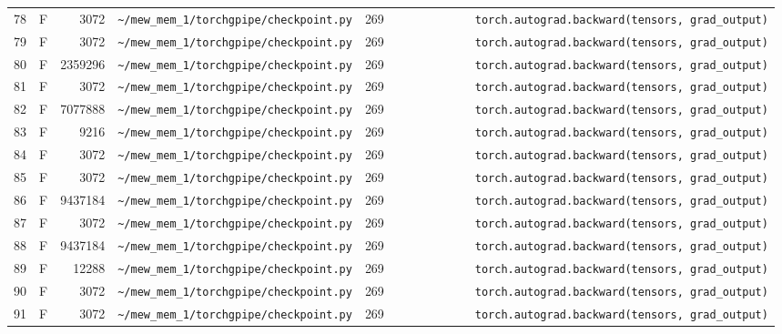 \documentclass{article}
\begin{document}
\begin{longtable}{r l r p{6.5cm} r p{7.0cm}}
78 & F & 3072 & \lstinline|~/mew_mem_1/torchgpipe/checkpoint.py| & 269 & \lstinline|            torch.autograd.backward(tensors, grad_output)| \\
79 & F & 3072 & \lstinline|~/mew_mem_1/torchgpipe/checkpoint.py| & 269 & \lstinline|            torch.autograd.backward(tensors, grad_output)| \\
80 & F & 2359296 & \lstinline|~/mew_mem_1/torchgpipe/checkpoint.py| & 269 & \lstinline|            torch.autograd.backward(tensors, grad_output)| \\
81 & F & 3072 & \lstinline|~/mew_mem_1/torchgpipe/checkpoint.py| & 269 & \lstinline|            torch.autograd.backward(tensors, grad_output)| \\
82 & F & 7077888 & \lstinline|~/mew_mem_1/torchgpipe/checkpoint.py| & 269 & \lstinline|            torch.autograd.backward(tensors, grad_output)| \\
83 & F & 9216 & \lstinline|~/mew_mem_1/torchgpipe/checkpoint.py| & 269 & \lstinline|            torch.autograd.backward(tensors, grad_output)| \\
84 & F & 3072 & \lstinline|~/mew_mem_1/torchgpipe/checkpoint.py| & 269 & \lstinline|            torch.autograd.backward(tensors, grad_output)| \\
85 & F & 3072 & \lstinline|~/mew_mem_1/torchgpipe/checkpoint.py| & 269 & \lstinline|            torch.autograd.backward(tensors, grad_output)| \\
86 & F & 9437184 & \lstinline|~/mew_mem_1/torchgpipe/checkpoint.py| & 269 & \lstinline|            torch.autograd.backward(tensors, grad_output)| \\
87 & F & 3072 & \lstinline|~/mew_mem_1/torchgpipe/checkpoint.py| & 269 & \lstinline|            torch.autograd.backward(tensors, grad_output)| \\
88 & F & 9437184 & \lstinline|~/mew_mem_1/torchgpipe/checkpoint.py| & 269 & \lstinline|            torch.autograd.backward(tensors, grad_output)| \\
89 & F & 12288 & \lstinline|~/mew_mem_1/torchgpipe/checkpoint.py| & 269 & \lstinline|            torch.autograd.backward(tensors, grad_output)| \\
90 & F & 3072 & \lstinline|~/mew_mem_1/torchgpipe/checkpoint.py| & 269 & \lstinline|            torch.autograd.backward(tensors, grad_output)| \\
91 & F & 3072 & \lstinline|~/mew_mem_1/torchgpipe/checkpoint.py| & 269 & \lstinline|            torch.autograd.backward(tensors, grad_output)| \\

\end{longtable}
\end{document}
